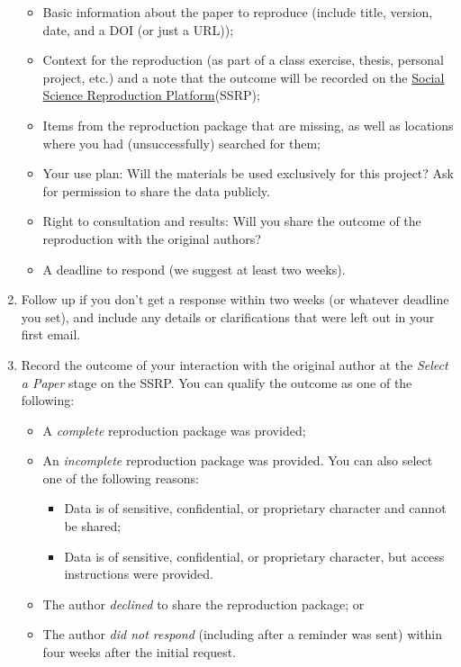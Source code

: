 \documentclass[
]{book}
\providecommand{\tightlist}{%
  \setlength{\itemsep}{0pt}\setlength{\parskip}{0pt}}
\begin{document}
\begin{enumerate}
  \begin{itemize}
  \tightlist
  \item
    Basic information about the paper to reproduce (include title, version, date, and a DOI (or just a URL));\\
  \item
    Context for the reproduction (as part of a class exercise, thesis, personal project, etc.) and a note that the outcome will be recorded on the \href{https://www.socialsciencereproduction.org/}{Social Science Reproduction Platform}(SSRP);
  \item
    Items from the reproduction package that are missing, as well as locations where you had (unsuccessfully) searched for them;\\
  \item
    Your use plan: Will the materials be used exclusively for this project? Ask for permission to share the data publicly.\\
  \item
    Right to consultation and results: Will you share the outcome of the reproduction with the original authors?\\
  \item
    A deadline to respond (we suggest at least two weeks).
  \end{itemize}
\item
  Follow up if you don't get a response within two weeks (or whatever deadline you set), and include any details or clarifications that were left out in your first email.
\item
  Record the outcome of your interaction with the original author at the \emph{Select a Paper} stage on the SSRP. You can qualify the outcome as one of the following:

  \begin{itemize}
  \tightlist
  \item
    A \emph{complete} reproduction package was provided;
  \item
    An \emph{incomplete} reproduction package was provided. You can also select one of the following reasons:

    \begin{itemize}
    \tightlist
    \item
      Data is of sensitive, confidential, or proprietary character and cannot be shared;
    \item
      Data is of sensitive, confidential, or proprietary character, but access instructions were provided.
    \end{itemize}
  \item
    The author \emph{declined} to share the reproduction package; or
  \item
    The author \emph{did not respond} (including after a reminder was sent) within four weeks after the initial request.
  \end{itemize}
\end{enumerate}
\end{document}
